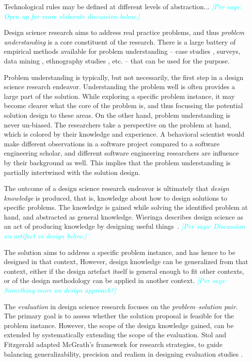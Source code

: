 \documentclass[graybox]{svmult}
\newcommand{\per}[1]{\textcolor{cyan}{{\it [Per says: #1]}}}
\newcommand{\per}[1]{}
\begin{document}
Technological rules may be defined at different levels of abstraction... \per{Open up for more elaborate discussion below.}

Design science research aims to address real practice problems, and thus \emph{problem understanding} is a core constituent of the research. There is a large battery of empirical methods available for problem understanding -- case studies \cite{Runeson12Case}, surveys, data mining \cite{MenziesDataMining2016}, ethnography studies \cite{SharpEthnography2016}, etc. -- that can be used for the purpose.

Problem understanding is typically, but not necessarily, the first step in a design science research endeavor. Understanding the problem well is often provides a large part of the solution. While exploring a specific problem instance,   it may become clearer what the core of the problem is, and thus focussing the potential solution design to these areas. On the other hand, problem understanding is never un-biased. The researchers take a perspective on the problem at hand, which is colored by their knowledge and experience. A behavioral scientist would make different observations in a software project compared to a software engineering scholar, and different software engineering researchers are influence by their background as well. This implies that the problem understanding is partially intertwined with the solution design.

The outcome of a design science research endeavor is ultimately that \emph{design knowledge} is produced, that is, knowledge about how to design solutions to specific problems. The knowledge is gained while solving the identified problem at hand, and abstracted as general knowledge. Wieringa describes design science as an act of producing knowledge by designing useful things~\cite{wieringa_design_2009}. \per{Discussion on artifact vs design below.}

The solution aims to address a specific problem instance, and has hence to be designed in that context, However, design knowledge can be generalized from that context, either if the design artefact itself is general enough to fit other contexts, or of the design methodology can be applied in another context.
\per{Something more on design approach?}

The \emph{evaluation} in design science research focuses on the \emph{problem--solution pair}. The primary goal is to assess whether the solution proposal is feasible for the problem instance. However, the scope of the design knowledge gained, can be extended by systematically extending the scope of the evaluation.  Stol and Fitzgerald adapted McGrath's framework for research strategies, to guide balancing generalizability, precision and realism in designing evaluation studies \cite{StolABC18}.
\end{document}
